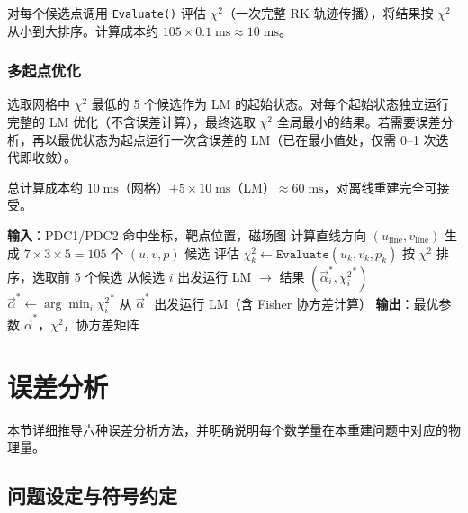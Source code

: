 \documentclass[a4paper, 11pt]{article}
\begin{document}
对每个候选点调用 \texttt{Evaluate()} 评估 $\chi^2$（一次完整 RK 轨迹传播），将结果按 $\chi^2$ 从小到大排序。计算成本约 $105 \times 0.1\;\mathrm{ms} \approx 10\;\mathrm{ms}$。

\subsubsection{多起点优化}

选取网格中 $\chi^2$ 最低的 5 个候选作为 LM 的起始状态。对每个起始状态独立运行完整的 LM 优化（不含误差计算），最终选取 $\chi^2$ 全局最小的结果。若需要误差分析，再以最优状态为起点运行一次含误差的 LM（已在最小值处，仅需 0--1 次迭代即收敛）。

总计算成本约 $10\;\mathrm{ms}$（网格）$+ 5 \times 10\;\mathrm{ms}$（LM）$\approx 60\;\mathrm{ms}$，对离线重建完全可接受。

\begin{algorithm}[H]
\caption{多起点 RK 动量重建}
\label{alg:multistart}
\begin{algorithmic}[1]
\State \textbf{输入}：PDC1/PDC2 命中坐标，靶点位置，磁场图
\State 计算直线方向 $(u_\mathrm{line}, v_\mathrm{line})$
\State 生成 $7 \times 3 \times 5 = 105$ 个 $(u, v, p)$ 候选
  \State 评估 $\chi^2_k \gets \texttt{Evaluate}(u_k, v_k, p_k)$
\EndFor
\State 按 $\chi^2$ 排序，选取前 5 个候选
  \State 从候选 $i$ 出发运行 LM $\to$ 结果 $(\vec{\alpha}_i^{*}, {\chi^2_i}^{*})$
\EndFor
\State $\vec{\alpha}^{*} \gets \arg\min_i {\chi^2_i}^{*}$
  \State 从 $\vec{\alpha}^*$ 出发运行 LM（含 Fisher 协方差计算）
\EndIf
\State \textbf{输出}：最优参数 $\vec{\alpha}^{*}$，$\chi^2$，协方差矩阵
\end{algorithmic}
\end{algorithm}

\section{误差分析}
\label{sec:error}

本节详细推导六种误差分析方法，并明确说明每个数学量在本重建问题中对应的物理量。

\subsection{问题设定与符号约定}
\end{document}
